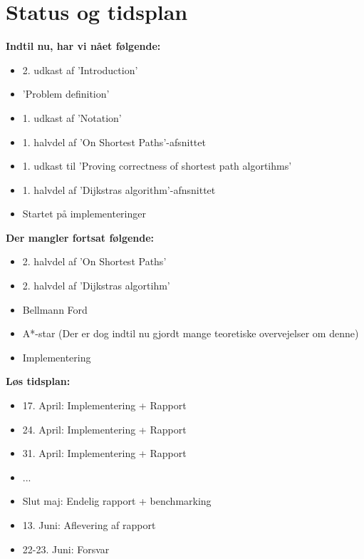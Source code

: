 \documentclass[11pt]{article}
\begin{document}
\section{Status og tidsplan}
\textbf{Indtil nu, har vi nået følgende:}\\
\begin{itemize}
\item 2. udkast af 'Introduction'
\item 'Problem definition'
\item 1. udkast af 'Notation'
\item 1. halvdel af 'On Shortest Paths'-afsnittet
\item 1. udkast til 'Proving correctness of shortest path algortihms'
\item 1. halvdel af 'Dijkstras algorithm'-afnsnittet
\item Startet på implementeringer
\end{itemize}
\textbf{Der mangler fortsat følgende:}\\
\begin{itemize}
\item 2. halvdel af 'On Shortest Paths'
\item 2. halvdel af 'Dijkstras algortihm'
\item Bellmann Ford
\item A*-star (Der er dog indtil nu gjordt mange teoretiske overvejelser om denne)
\item Implementering
\end{itemize}
\newpage
\textbf{Løs tidsplan:}\\
\begin{itemize}
\item 17. April: Implementering + Rapport
\item 24. April: Implementering + Rapport
\item 31. April: Implementering + Rapport
\item ...
\item Slut maj: Endelig rapport + benchmarking
\item 13. Juni: Aflevering af rapport
\item 22-23. Juni: Forsvar
\end{itemize}
\end{document}

